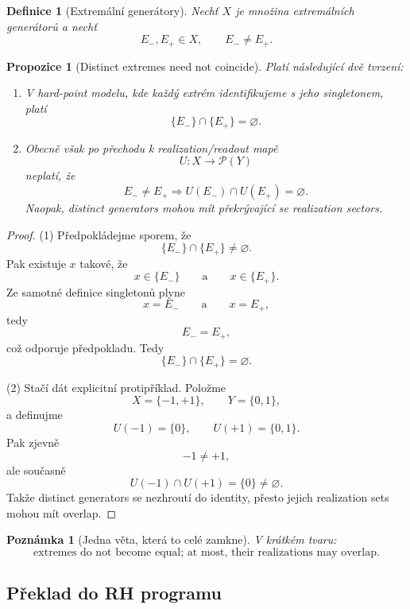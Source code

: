 \documentclass[11pt,a4paper]{article}
\newtheorem{definition}[theorem]{Definice}
\newtheorem{remark}[theorem]{Poznámka}
\newtheorem{proposition}[theorem]{Propozice}
\begin{document}
\begin{definition}[Extremální generátory]
Nechť \(X\) je množina extremálních generátorů a nechť
\[
E_-,E_+\in X,
\qquad
E_-\neq E_+.
\]
\end{definition}

\begin{proposition}[Distinct extremes need not coincide]
Platí následující dvě tvrzení:
\begin{enumerate}[label=\textbf{(\arabic*)}]
    \item V hard-point modelu, kde každý extrém identifikujeme s jeho singletonem, platí
    \[
    \{E_-\}\cap \{E_+\}=\varnothing.
    \]

    \item Obecně však po přechodu k realization/readout mapě
    \[
    U:X\to \mathcal P(Y)
    \]
    neplatí, že
    \[
    E_-\neq E_+ \Longrightarrow U(E_-)\cap U(E_+)=\varnothing.
    \]
    Naopak, distinct generators mohou mít překrývající se realization sectors.
\end{enumerate}
\end{proposition}

\begin{proof}
(1) Předpokládejme sporem, že
\[
\{E_-\}\cap \{E_+\}\neq \varnothing.
\]
Pak existuje \(x\) takové, že
\[
x\in \{E_-\}
\qquad\text{a}\qquad
x\in \{E_+\}.
\]
Ze samotné definice singletonů plyne
\[
x=E_-
\qquad\text{a}\qquad
x=E_+,
\]
tedy
\[
E_-=E_+,
\]
což odporuje předpokladu. Tedy
\[
\{E_-\}\cap \{E_+\}=\varnothing.
\]

(2) Stačí dát explicitní protipříklad. Položme
\[
X=\{-1,+1\},
\qquad
Y=\{0,1\},
\]
a definujme
\[
U(-1)=\{0\},
\qquad
U(+1)=\{0,1\}.
\]
Pak zjevně
\[
-1\neq +1,
\]
ale současně
\[
U(-1)\cap U(+1)=\{0\}\neq \varnothing.
\]
Takže distinct generators se nezhroutí do identity, přesto jejich realization sets mohou mít overlap.
\end{proof}

\begin{remark}[Jedna věta, která to celé zamkne]
V krátkém tvaru:
\[
\text{extremes do not become equal; at most, their realizations may overlap.}
\]
\end{remark}

\subsection*{Překlad do RH programu}
\end{document}
